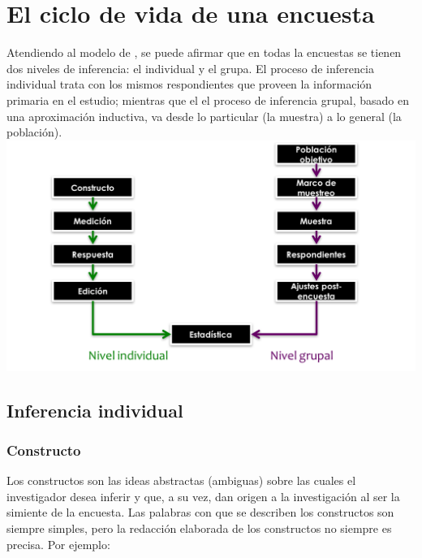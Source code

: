 \documentclass[
  10pt,
  spanish,
]{book}
\begin{document}
\hypertarget{el-ciclo-de-vida-de-una-encuesta}{%
\section{El ciclo de vida de una encuesta}\label{el-ciclo-de-vida-de-una-encuesta}}

Atendiendo al modelo de \citet{Groves_Fowler_Couper_Lepkowski_Singer_Tourangeau_2009}, se puede afirmar que en todas la encuestas se tienen dos niveles de inferencia: el individual y el grupa. El proceso de inferencia individual trata con los mismos respondientes que proveen la información primaria en el estudio; mientras que el el proceso de inferencia grupal, basado en una aproximación inductiva, va desde lo particular (la muestra) a lo general (la población).
\includegraphics{Pics/Picture6.png}

\hypertarget{inferencia-individual}{%
\subsection{Inferencia individual}\label{inferencia-individual}}

\hypertarget{constructo}{%
\subsubsection*{Constructo}\label{constructo}}

Los constructos son las ideas abstractas (ambiguas) sobre las cuales el investigador desea inferir y que, a su vez, dan origen a la investigación al ser la simiente de la encuesta. Las palabras con que se describen los constructos son siempre simples, pero la redacción elaborada de los constructos no siempre es precisa. Por ejemplo:
\end{document}
